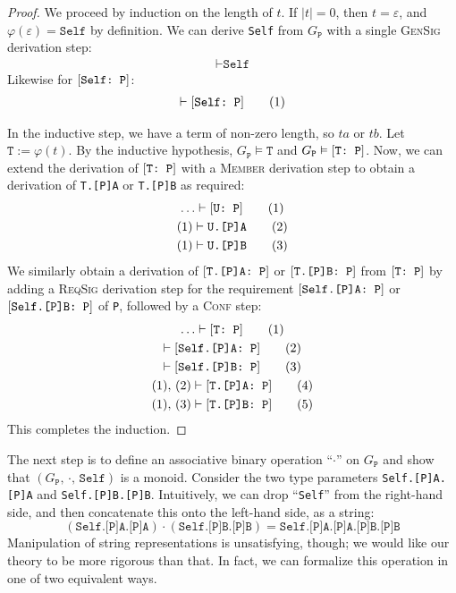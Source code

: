\documentclass[../generics]{subfiles}
\begin{document}
\begin{proof}
We proceed by induction on the length of $t$. If $|t|=0$, then $t=\varepsilon$, and $\varphi(\varepsilon)=\texttt{Self}$ by definition. We can derive \texttt{Self} from $G_\texttt{P}$ with a single \textsc{GenSig} derivation step:
\begin{gather*}
\vdash\texttt{Self}\tag{1}
\end{gather*}
Likewise for $[\texttt{Self:~P}]$:
\begin{gather*}
\vdash[\texttt{Self:~P}]\tag{1}
\end{gather*}

In the inductive step, we have a term of non-zero length, so $ta$ or $tb$. Let $\texttt{T}:=\varphi(t)$. By the inductive hypothesis, $G_\texttt{P}\vDash\texttt{T}$ and $G_\texttt{P}\vDash[\texttt{T:~P}]$. Now, we can extend the derivation of $[\texttt{T:~P}]$ with a \textsc{Member} derivation step to obtain a derivation of \texttt{T.[P]A} or \texttt{T.[P]B} as required:
\begin{gather*}
\ldots\vdash[\texttt{U:~P}]\tag{1}\\
(1)\vdash\texttt{U.[P]A}\tag{2}\\
(1)\vdash\texttt{U.[P]B}\tag{3}
\end{gather*}
We similarly obtain a derivation of $[\texttt{T.[P]A:~P}]$ or $[\texttt{T.[P]B:~P}]$ from $[\texttt{T:~P}]$ by adding a \textsc{ReqSig} derivation step for the requirement $[\texttt{Self.[P]A:~P}]$ or $[\texttt{Self.[P]B:~P}]$ of \texttt{P}, followed by a \textsc{Conf} step:
\begin{gather*}
\ldots\vdash[\texttt{T:~P}]\tag{1}\\
\vdash[\texttt{Self.[P]A:~P}]\tag{2}\\
\vdash[\texttt{Self.[P]B:~P}]\tag{3}\\
(1),\,(2)\vdash[\texttt{T.[P]A:~P}]\tag{4}\\
(1),\,(3)\vdash[\texttt{T.[P]B:~P}]\tag{5}
\end{gather*}
This completes the induction.
\end{proof}

The next step is to define an associative binary operation ``$\cdot$'' on $G_\texttt{P}$ and show that $(G_\texttt{P},\,\cdot,\,\texttt{Self})$ is a monoid. Consider the two type parameters \texttt{Self.[P]A.[P]A} and \texttt{Self.[P]B.[P]B}. Intuitively, we can drop ``\texttt{Self}'' from the right-hand side, and then concatenate this onto the left-hand side, as a string:
\[(\texttt{Self.[P]A.[P]A})\cdot(\texttt{Self.[P]B.[P]B})=\texttt{Self.[P]A.[P]A.[P]B.[P]B}\]
Manipulation of string representations is unsatisfying, though; we would like our theory to be more rigorous than that. In fact, we can formalize this operation in one of two equivalent ways.
\end{document}
